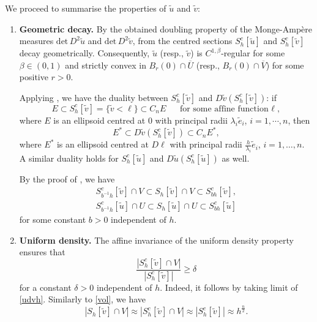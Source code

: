 \documentclass[11pt]{amsart}
\theoremstyle{plain}
\renewcommand{\det}{\mbox{det}}
\newcommand{\0}{\textbf{0}}
\numberwithin{equation}{section}
\numberwithin{equation}{section}
\numberwithin{figure}{section}
\begin{document}
We proceed to summarise the properties of \( \tilde{u} \) and \( \tilde{v} \):
\begin{enumerate}
    \item \textbf{Geometric decay.} By the obtained doubling property of the Monge-Amp\`ere measures $\det\, D^2\tilde u$ and $\det\, D^2\tilde v$, from \cite[Lemma 2.2]{C96} the centred sections \( S_h^c[\tilde{u}] \) and \( S_h^c[\tilde{v}] \) decay geometrically. Consequently, \( \tilde{u} \) (resp., \( \tilde{v} \)) is \( C^{1,\beta} \)-regular for some $\beta\in(0,1)$ and strictly convex in \( B_{r}(0) \cap \overline{U} \) (resp., \( B_{r}(0) \cap \overline{V} \)) for some positive \( r > 0 \).  
    
Applying \cite[Corollary 2.2]{C96}, we have the duality between $S_h^c[\tilde{v}]$ and $D\tilde{v}(S_h^c[\tilde{v}])$: if 
	\[ E\subset  S_h^c[\tilde v] = \{\tilde{v} < \ell\} \subset C_nE\quad\text{ for some affine function $\ell$}, \]
where $E$ is an ellipsoid centred at $0$ with principal radii $\lambda_i\tilde e_i$, $i=1,\cdots, n$, then
	\[ E^*\subset D\tilde{v}(S_h^c[\tilde v])\subset C_n E^*, \]
where $E^*$ is an ellipsoid centred at $D\ell$ with principal radii $\frac{h}{\lambda_i}\tilde e_i$, $i=1,\ldots, n$.
A similar duality holds for $S_h^c[\tilde{u}]$ and $D\tilde{u}(S_h^c[\tilde{u}])$ as well.
 
By the proof of \cite[Lemma 2.2]{CLW1}, we have
\begin{align}
S^c_{b^{-1}h}[\tilde v] \cap V \subset S_h[\tilde v] \cap V \subset S^c_{bh}[\tilde v], \label{equi02} \\
S^c_{b^{-1}h}[\tilde u] \cap U \subset S_h[\tilde u] \cap U \subset S^c_{bh}[\tilde u] \label{equi03}
\end{align}
for some constant \( b > 0 \) independent of \( h \).
    
   
   
    \item \textbf{Uniform density.} The affine invariance of the uniform density property ensures that
    \[ \frac{|S_h^c[\tilde{v}] \cap V|}{|S_h^c[\tilde{v}]|} \geq \delta \]
    for a constant \( \delta > 0 \) independent of \( h \). Indeed, it follows by taking limit of \eqref{udvh}.
    Similarly to \eqref{vol}, we have \begin{equation}\label{vol1}
|S_h[\tilde v]\cap V| \approx |S_h^c[\tilde v]\cap V| \approx |S_h^c[\tilde v]| \approx h^{\frac{n}{2}}.
\end{equation}
    

\end{enumerate}
\end{document}
